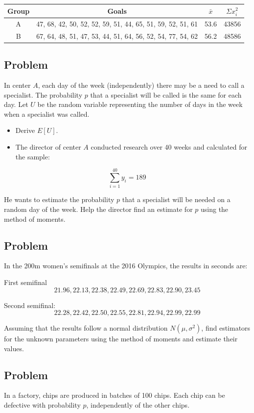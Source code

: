 \documentclass[a4paper, 12pt]{article}
\begin{document}
\begin{table}[h!]
\centering
\begin{tabular}{|c|c|c|c|}
\hline
Group & Goals                                                      & $\bar{x}$ & $\Sigma x_i^{2}$ \\ \hline
A     & 47, 68, 42, 50, 52, 52, 59, 51, 44, 65, 51, 59, 52, 51, 61 & 53.6      & 43856            \\ \hline
B     & 67, 64, 48, 51, 47, 53, 44, 51, 64, 56, 52, 54, 77, 54, 62 & 56.2      & 48586            \\ \hline
\end{tabular}
\end{table}


\subsection{Problem}
In center $A$, each day of the week (independently) there may be a need to call a specialist. The probability $p$ that a specialist will be called is the same for each day. Let $U$ be the random variable representing the number of days in the week when a specialist was called.
\begin{itemize}
  \item [a)] Derive $E[U]$.
   \item [b)] The director of center $A$ conducted research over 40 weeks and calculated for the sample:
\end{itemize}
\[
\sum_{i=1}^{40} y_i = 189
\]

He wants to estimate the probability $p$ that a specialist will be needed on a random day of the week. Help the director find an estimate for $p$ using the method of moments.


\subsection{Problem}
In the 200m women's semifinals at the 2016 Olympics, the results in seconds are:

First semifinal
\[
21.96, 22.13, 22.38, 22.49, 22.69, 22.83, 22.90, 23.45
\]

Second semifinal:
\[
22.28, 22.42, 22.50, 22.55, 22.81, 22.94, 22.99, 22.99
\]

Assuming that the results follow a normal distribution $N(\mu, \sigma^2)$, find estimators for the unknown parameters using the method of moments and estimate their values.

\subsection{Problem}
In a factory, chips are produced in batches of 100 chips. Each chip can be defective with probability $p$, independently of the other chips.
\end{document}
